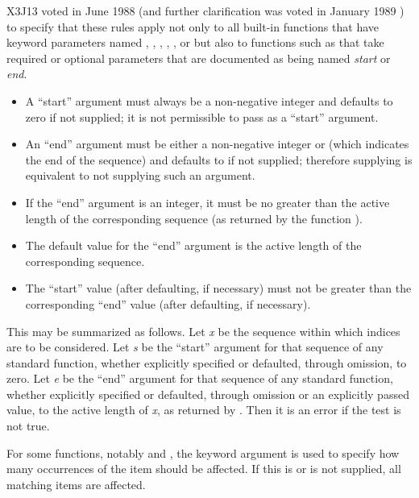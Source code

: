 \begin{newer}
X3J13 voted in June 1988 
(and further clarification was voted in January 1989
)
to specify that these rules apply not
only to all built-in functions that have keyword parameters named
, , , , ,
or  but also to functions such as 
that take required or optional parameters that are documented
as being named \emph{start} or \emph{end}.
\begin{itemize}
\item A ``start'' argument must always be a non-negative integer and
defaults to zero if not supplied; it is not permissible to pass 
as a ``start'' argument.
\item An ``end'' argument must be either a
non-negative integer or  (which indicates the end of the
sequence) and defaults to 
if not supplied; therefore supplying  is equivalent to
not supplying such an argument.
\item If the ``end'' argument is an integer, it must be no greater than the
active length of the corresponding sequence
(as returned by the function ).
\item The default value for the ``end'' argument is the active length
of the corresponding sequence.
\item The ``start'' value (after defaulting, if necessary) must not be greater than the
corresponding ``end'' value (after defaulting, if necessary).
\end{itemize}
This may be summarized as follows.
Let \emph{x} be the sequence within which indices are to be considered.  Let \emph{s} be
the ``start'' argument for that sequence of any standard function,
whether explicitly specified or defaulted, through omission, to
zero.  Let \emph{e} be the ``end'' argument for that sequence
of any standard function, whether explicitly specified or defaulted, through
omission or an explicitly passed  value, to the active length of \emph{x}, as
returned by .  Then it is an error if the test
is not true.
\end{newer}

For some functions, notably  and , the keyword argument
 is used to specify how many occurrences of the item should
be affected.  If this is {\false} or is not supplied, all matching items are
affected.

